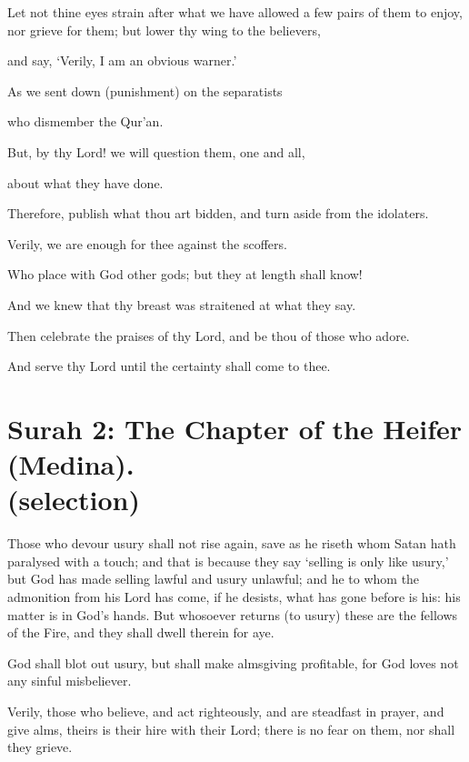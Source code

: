 \documentclass[fontsize=14pt, letterpaper, notitlepage, openany, DIV=12]{scrbook} %
\begin{document}
\noindent[15:88]
Let not thine eyes strain after what we have allowed a few pairs of them to enjoy, nor
grieve for them; but lower thy wing to the believers,

\noindent[15:89]
and say, `Verily, I am an obvious warner.'

\noindent[15:90]
As we sent down (punishment) on the separatists

\noindent[15:91]
who dismember the Qur'an.

\noindent[15:92]
But, by thy Lord! we will question them, one and all,

\noindent[15:93]
about what they have done.

\noindent[15:94]
Therefore, publish what thou art bidden, and turn aside from the idolaters.

\noindent[15:95]
Verily, we are enough for thee against the scoffers.

\noindent[15:96]
Who place with God other gods; but they at length shall know!

\noindent[15:97]
And we knew that thy breast was straitened at what they say.

\noindent[15:98]
Then celebrate the praises of thy Lord, and be thou of those who adore.

\noindent[15:99]
And serve thy Lord until the certainty shall come to thee.


\section[Surah 2: The Chapter of the Heifer (Medina).]{Surah 2: The Chapter of the Heifer (Medina).\\ (selection)}


\noindent[2:275]
Those who devour usury shall not rise again, save as he riseth whom Satan hath paralysed
with a touch; and that is because they say `selling is only like usury,' but God has made selling
lawful and usury unlawful; and he to whom the admonition from his Lord has come, if he
desists, what has gone before is his: his matter is in God's hands. But whosoever returns (to
usury) these are the fellows of the Fire, and they shall dwell therein for aye.

\noindent[2:276]
God shall blot out usury, but shall make almsgiving profitable, for God loves not any
sinful misbeliever.

\noindent[2:277]
Verily, those who believe, and act righteously, and are steadfast in prayer, and give alms,
theirs is their hire with their Lord; there is no fear on them, nor shall they grieve.
\end{document}
